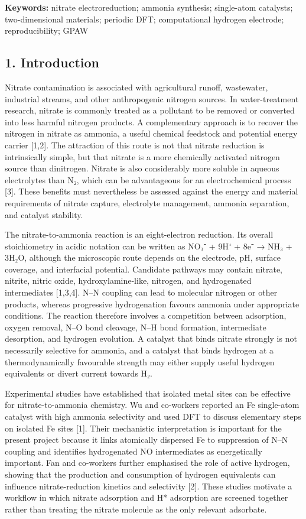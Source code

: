 \documentclass[
]{article}
\begin{document}
\textbf{Keywords:} nitrate electroreduction; ammonia synthesis;
single-atom catalysts; two-dimensional materials; periodic DFT;
computational hydrogen electrode; reproducibility; GPAW

\hypertarget{introduction}{%
\subsection{1. Introduction}\label{introduction}}

Nitrate contamination is associated with agricultural runoff,
wastewater, industrial streams, and other anthropogenic nitrogen
sources. In water-treatment research, nitrate is commonly treated as a
pollutant to be removed or converted into less harmful nitrogen
products. A complementary approach is to recover the nitrogen in nitrate
as ammonia, a useful chemical feedstock and potential energy carrier
{[}1,2{]}. The attraction of this route is not that nitrate reduction is
intrinsically simple, but that nitrate is a more chemically activated
nitrogen source than dinitrogen. Nitrate is also considerably more
soluble in aqueous electrolytes than N₂, which can be advantageous for
an electrochemical process {[}3{]}. These benefits must nevertheless be
assessed against the energy and material requirements of nitrate
capture, electrolyte management, ammonia separation, and catalyst
stability.

The nitrate-to-ammonia reaction is an eight-electron reduction. Its
overall stoichiometry in acidic notation can be written as NO₃⁻ + 9H⁺ +
8e⁻ → NH₃ + 3H₂O, although the microscopic route depends on the
electrode, pH, surface coverage, and interfacial potential. Candidate
pathways may contain nitrate, nitrite, nitric oxide, hydroxylamine-like,
nitrogen, and hydrogenated intermediates {[}1,3,4{]}. N--N coupling can
lead to molecular nitrogen or other products, whereas progressive
hydrogenation favours ammonia under appropriate conditions. The reaction
therefore involves a competition between adsorption, oxygen removal,
N--O bond cleavage, N--H bond formation, intermediate desorption, and
hydrogen evolution. A catalyst that binds nitrate strongly is not
necessarily selective for ammonia, and a catalyst that binds hydrogen at
a thermodynamically favourable strength may either supply useful
hydrogen equivalents or divert current towards H₂.

Experimental studies have established that isolated metal sites can be
effective for nitrate-to-ammonia chemistry. Wu and co-workers reported
an Fe single-atom catalyst with high ammonia selectivity and used DFT to
discuss elementary steps on isolated Fe sites {[}1{]}. Their mechanistic
interpretation is important for the present project because it links
atomically dispersed Fe to suppression of N--N coupling and identifies
hydrogenated NO intermediates as energetically important. Fan and
co-workers further emphasised the role of active hydrogen, showing that
the production and consumption of hydrogen equivalents can influence
nitrate-reduction kinetics and selectivity {[}2{]}. These studies
motivate a workflow in which nitrate adsorption and H* adsorption are
screened together rather than treating the nitrate molecule as the only
relevant adsorbate.
\end{document}
